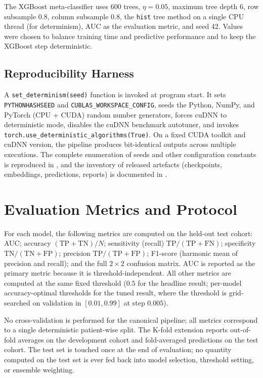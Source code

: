 The XGBoost meta-classifier uses 600 trees, $\eta = 0.05$, maximum tree depth 6, row subsample 0.8, column subsample 0.8, the \texttt{hist} tree method on a single CPU thread (for determinism), AUC as the evaluation metric, and seed 42. Values were chosen to balance training time and predictive performance and to keep the XGBoost step deterministic.

\subsection{Reproducibility Harness}

A \texttt{set\_determinism(seed)} function is invoked at program start. It sets \newline \texttt{PYTHONHASHSEED} and \texttt{CUBLAS\_WORKSPACE\_CONFIG}, seeds the Python, NumPy, and PyTorch (CPU + CUDA) random number generators, forces cuDNN to deterministic mode, disables the cuDNN benchmark autotuner, and invokes \newline \texttt{torch.use\_deterministic\_algorithms(True)}. On a fixed CUDA toolkit and cuDNN version, the pipeline produces bit-identical outputs across multiple executions. The complete enumeration of seeds and other configuration constants is reproduced in , and the inventory of released artefacts (checkpoints, embeddings, predictions, reports) is documented in .

\section{Evaluation Metrics and Protocol}

For each model, the following metrics are computed on the held-out test cohort: AUC; accuracy $(\mathrm{TP}+\mathrm{TN})/N$; sensitivity (recall) $\mathrm{TP}/(\mathrm{TP}+\mathrm{FN})$; specificity $\mathrm{TN}/(\mathrm{TN}+\mathrm{FP})$; precision $\mathrm{TP}/(\mathrm{TP}+\mathrm{FP})$; F1-score (harmonic mean of precision and recall); and the full $2\times 2$ confusion matrix. AUC is reported as the primary metric because it is threshold-independent. All other metrics are computed at the same fixed threshold ($0.5$ for the headline result; per-model accuracy-optimal thresholds for the tuned result, where the threshold is grid-searched on validation in $[0.01, 0.99]$ at step $0.005$).

No cross-validation is performed for the canonical pipeline; all metrics correspond to a single deterministic patient-wise split. The K-fold extension reports out-of-fold averages on the development cohort and fold-averaged predictions on the test cohort. The test set is touched once at the end of evaluation; no quantity computed on the test set is ever fed back into model selection, threshold setting, or ensemble weighting.

